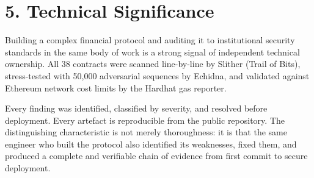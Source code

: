 \documentclass[11pt,a4paper]{article}
\begin{document}
\section*{5. Technical Significance}
Building a complex financial protocol and auditing it to institutional security standards in the same body of work is a strong signal of independent technical ownership. All 38 contracts were scanned line-by-line by Slither (Trail of Bits), stress-tested with 50,000 adversarial sequences by Echidna, and validated against Ethereum network cost limits by the Hardhat gas reporter.

Every finding was identified, classified by severity, and resolved before deployment. Every artefact is reproducible from the public repository. The distinguishing characteristic is not merely thoroughness: it is that the same engineer who built the protocol also identified its weaknesses, fixed them, and produced a complete and verifiable chain of evidence from first commit to secure deployment.
\end{document}
